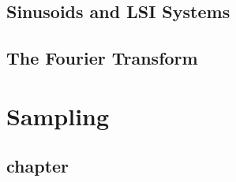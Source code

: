 \documentclass{scrbook}
\begin{document}
\chapter{Sinusoids and LSI Systems}





\chapter{The Fourier Transform}






\part{Sampling}
\chapter{chapter}
















\end{document}
